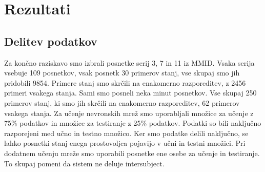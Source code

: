 \chapter{Rezultati}
\section{Delitev podatkov}
Za končno raziskavo smo izbrali posnetke serij 3, 7 in 11 iz MMID. Vsaka serija vsebuje 109 posnetkov, vsak posnetk 30 primerov stanj, vse skupaj smo jih pridobili 9854. Primere stanj smo skrčili na enakomerno razporeditev, z 2456 primeri vsakega stanja. Sami smo posneli neka minut posnetkov. Vse skupaj 250 primerov stanj, ki smo jih skrčili na enakomerno razporeditev, 62 primerov vsakega stanja. Za učenje nevronskih mrež smo uporabljali množice za učenje z 75\% podatkov in množice za testiranje z 25\% podatkov. Podatki so bili naključno razporejeni med učno in testno množico. Ker smo podatke delili naključno, se lahko posnetki stanj enega prostovoljca pojavijo v učni in testni množici. Pri dodatnem učenju mreže smo uporabili posnetke ene osebe za učenje in testiranje. To skupaj pomeni da sistem ne deluje intersubject. 

